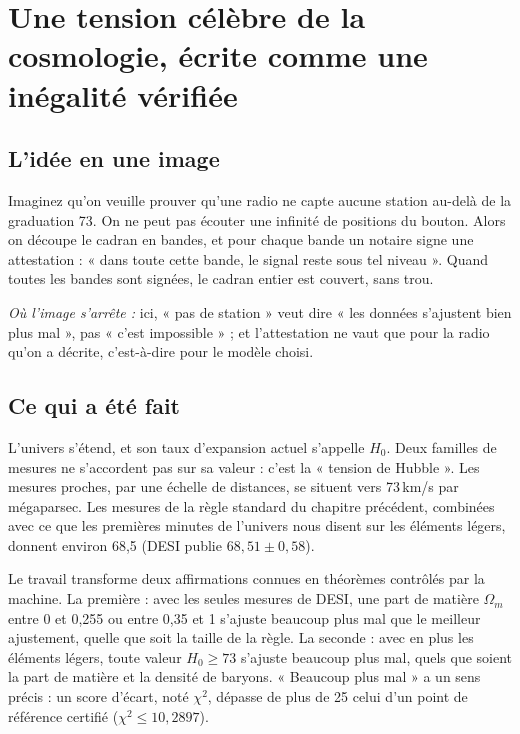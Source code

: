 \chapter[Une tension écrite comme une inégalité]{Une tension célèbre de la cosmologie, écrite comme une inégalité vérifiée}

\section*{L'idée en une image}

\begin{analogie}
Imaginez qu'on veuille prouver qu'une radio ne capte aucune station au-delà de la graduation 73. On ne peut pas
écouter une infinité de positions du bouton. Alors on découpe le cadran en bandes, et pour chaque bande un notaire
signe une attestation : « dans toute cette bande, le signal reste sous tel niveau ». Quand toutes les bandes sont
signées, le cadran entier est couvert, sans trou.

\emph{Où l'image s'arrête :} ici, « pas de station » veut dire « les données s'ajustent bien plus mal », pas
« c'est impossible » ; et l'attestation ne vaut que pour la radio qu'on a décrite, c'est-à-dire pour le modèle choisi.
\end{analogie}

\section*{Ce qui a été fait}

L'univers s'étend, et son taux d'expansion actuel s'appelle $H_0$. Deux familles de mesures ne s'accordent pas sur sa
valeur : c'est la « tension de Hubble ». Les mesures proches, par une échelle de distances, se situent vers
73\,km/s par mégaparsec. Les mesures de la règle standard du chapitre précédent, combinées avec ce que les premières
minutes de l'univers nous disent sur les éléments légers, donnent environ 68,5 (DESI publie $68{,}51\pm0{,}58$).

Le travail transforme deux affirmations connues en théorèmes contrôlés par la machine. La première : avec les seules
mesures de DESI, une part de matière $\Omega_m$ entre 0 et 0,255 ou entre 0,35 et 1 s'ajuste beaucoup plus mal que
le meilleur ajustement, quelle que soit la taille de la règle. La seconde : avec en plus les éléments légers, toute
valeur $H_0\ge73$ s'ajuste beaucoup plus mal, quels que soient la part de matière et la densité de baryons. « Beaucoup
plus mal » a un sens précis : un score d'écart, noté $\chi^2$, dépasse de plus de 25 celui d'un point de référence
certifié ($\chi^2\le10{,}2897$).

